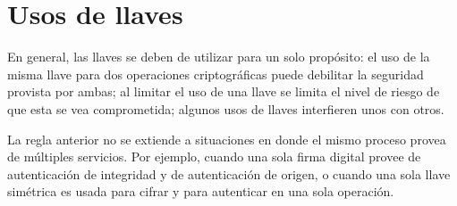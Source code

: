 %
%
%
%

\section{Usos de llaves}

En general, las llaves se deben de utilizar para un solo propósito: el uso de
la misma llave para dos operaciones criptográficas puede debilitar la seguridad
provista por ambas; al limitar el uso de una llave se limita el nivel de riesgo
de que esta se vea comprometida; algunos usos de llaves interfieren unos
con otros.

La regla anterior no se extiende a situaciones en donde el mismo
proceso provea de múltiples servicios. Por ejemplo, cuando una sola firma
digital provee de autenticación de integridad y de autenticación de origen,
o cuando una sola llave simétrica es usada para cifrar y para autenticar en
una sola operación.

